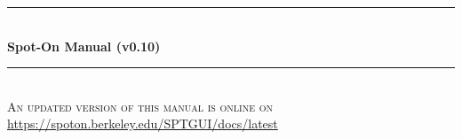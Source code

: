 \begin{titlepage}

\newcommand{\HRule}{\rule{\linewidth}{0.5mm}} %

\center %
 


\HRule \\[0.4cm]
       { \huge \bfseries Spot-On Manual (v0.10)
       }\\[0.4cm] %
\HRule \\[1cm]

\textsc{\large An updated version of this manual is online on}\\[0.2cm] %
\large \url{https://spoton.berkeley.edu/SPTGUI/docs/latest}\\[0.5cm]





\end{titlepage}
